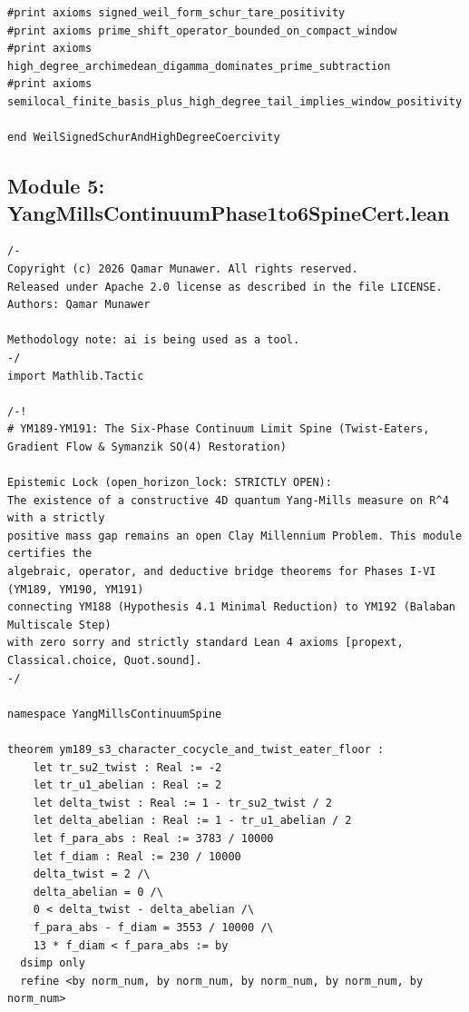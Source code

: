 \documentclass[11pt,a4paper]{article}
\begin{document}
\begin{lstlisting}[language=Lean4]
#print axioms signed_weil_form_schur_tare_positivity
#print axioms prime_shift_operator_bounded_on_compact_window
#print axioms high_degree_archimedean_digamma_dominates_prime_subtraction
#print axioms semilocal_finite_basis_plus_high_degree_tail_implies_window_positivity

end WeilSignedSchurAndHighDegreeCoercivity

\end{lstlisting}

\subsection{Module 5: YangMillsContinuumPhase1to6SpineCert.lean}
\begin{lstlisting}[language=Lean4]
/-
Copyright (c) 2026 Qamar Munawer. All rights reserved.
Released under Apache 2.0 license as described in the file LICENSE.
Authors: Qamar Munawer

Methodology note: ai is being used as a tool.
-/
import Mathlib.Tactic

/-!
# YM189-YM191: The Six-Phase Continuum Limit Spine (Twist-Eaters, Gradient Flow & Symanzik SO(4) Restoration)

Epistemic Lock (open_horizon_lock: STRICTLY OPEN):
The existence of a constructive 4D quantum Yang-Mills measure on R^4 with a strictly
positive mass gap remains an open Clay Millennium Problem. This module certifies the
algebraic, operator, and deductive bridge theorems for Phases I-VI (YM189, YM190, YM191)
connecting YM188 (Hypothesis 4.1 Minimal Reduction) to YM192 (Balaban Multiscale Step)
with zero sorry and strictly standard Lean 4 axioms [propext, Classical.choice, Quot.sound].
-/

namespace YangMillsContinuumSpine

theorem ym189_s3_character_cocycle_and_twist_eater_floor :
    let tr_su2_twist : Real := -2
    let tr_u1_abelian : Real := 2
    let delta_twist : Real := 1 - tr_su2_twist / 2
    let delta_abelian : Real := 1 - tr_u1_abelian / 2
    let f_para_abs : Real := 3783 / 10000
    let f_diam : Real := 230 / 10000
    delta_twist = 2 /\
    delta_abelian = 0 /\
    0 < delta_twist - delta_abelian /\
    f_para_abs - f_diam = 3553 / 10000 /\
    13 * f_diam < f_para_abs := by
  dsimp only
  refine <by norm_num, by norm_num, by norm_num, by norm_num, by norm_num>


\end{lstlisting}
\end{document}
